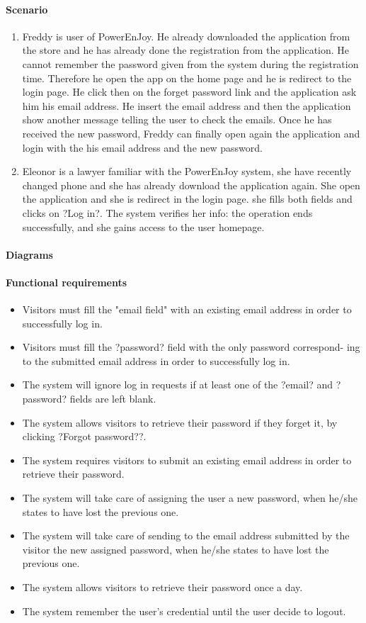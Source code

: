 \paragraph{Scenario}
\begin {enumerate}
\item Freddy is user of PowerEnJoy. He already downloaded the application from the store and he has already done the registration from the application. He cannot remember the password given from the system during the registration time. Therefore he open the app on the home page and he is redirect to the login page. He click then on the forget password link and the application ask him his email address. He insert the email address and then the application show another message telling the user to check the emails. Once he has received the new password, Freddy can finally open again the application and login with the his email address and the new password.
\item Eleonor is a lawyer familiar with the PowerEnJoy system, she have recently changed phone and she has already download the application again. She open the application and she is redirect in the login page. she fills both fields and clicks on ?Log in?. The system verifies her info: the operation ends successfully, and she gains access to the user homepage.
\end{enumerate}
\paragraph{Diagrams}
\paragraph{Functional requirements }
\begin{itemize}
	\item Visitors must fill the "email field" with an existing email address in order to successfully log in.
	\item Visitors must fill the ?password? field with the only password correspond- ing to the submitted email address in order to successfully log in.
	\item The system will ignore log in requests if at least one of the ?email? and ?password? fields are left blank.
	\item The system allows visitors to retrieve their password if they forget it, by clicking ?Forgot password??.
	\item The system requires visitors to submit an existing email address in order to retrieve their password.
	\item The system will take care of assigning the user a new password, when he/she states to have lost the previous one.
	\item The system will take care of sending to the email address submitted by the visitor the new assigned password, when he/she states to have lost the previous one.
	\item The system allows visitors to retrieve their password once a day.
	\item The system remember the user's credential until the user decide to logout.
\end{itemize}

